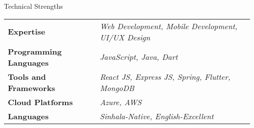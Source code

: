 \documentclass[
	11pt, %
]{./../assets/resume} %
\begin{document}
	




\begin{rSection}{Technical Strengths}

	\def\arraystretch{1.5}

	\begin{tabular}{ l l}
		\textbf{Expertise} & \emph{Web Development, Mobile Development, UI/UX Design} \\
		\textbf{Programming Languages} & \emph{JavaScript, Java, Dart} \\
		\textbf{Tools and Frameworks} & \emph{React JS, Express JS, Spring, Flutter, MongoDB} \\ 
		\textbf{Cloud Platforms} & \emph{Azure, AWS} \\ 
		\textbf{Languages} & \emph{Sinhala-Native, English-Excellent} \\
	\end{tabular}

\end{rSection}
\end{document}
